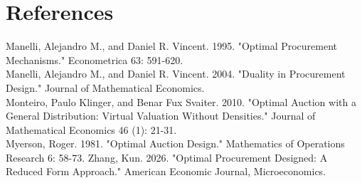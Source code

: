 \documentclass[10pt]{article}
\begin{document}
\section*{References}
Manelli, Alejandro M., and Daniel R. Vincent. 1995. "Optimal Procurement Mechanisms." Econometrica 63: 591-620.\\
Manelli, Alejandro M., and Daniel R. Vincent. 2004. "Duality in Procurement Design." Journal of Mathematical Economics.\\
Monteiro, Paulo Klinger, and Benar Fux Svaiter. 2010. "Optimal Auction with a General Distribution: Virtual Valuation Without Densities." Journal of Mathematical Economics 46 (1): 21-31.\\
Myerson, Roger. 1981. "Optimal Auction Design." Mathematics of Operations Research 6: 58-73. Zhang, Kun. 2026. "Optimal Procurement Designed: A Reduced Form Approach." American Economic Journal, Microeconomics.
\end{document}
